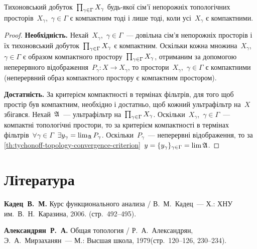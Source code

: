 \begin{theorem}
    Тихоновський добуток~$\prod_{\gamma\in\Gamma}{X}_\gamma$ будь-якої сім'ї непорожніх топологічних просторів~$X_\gamma$,~$\gamma \in \Gamma$ є компактним тоді і лише тоді, коли усі~$X_\gamma$ є компактними.
\end{theorem}

\begin{proof}
    \textbf{Необхідність.} Нехай~$X_\gamma$,~$\gamma \in \Gamma$~--- довільна сім'я непорожніх просторів і їх тихоновський добуток~$\prod_{\gamma\in\Gamma}{X}_\gamma$ є компактним. Оскільки кожна множина~$X_\gamma$,~$\gamma \in \Gamma$ є образом компактного простору~$\prod_{\gamma\in\Gamma}{X}_\gamma$, отриманим за допомогою неперервного відображення~$P_\gamma: X \to X_\gamma$, то простори~$X_\gamma$,~$\gamma \in \Gamma$ є компактними (неперервний образ компактного простору є компактним простором).

    \textbf{Достатність.} За критерієм компактності в термінах фільтрів, для того щоб простір був компактним, необхідно і достатньо, щоб кожний ультрафільтр на~$X$ збігався. Нехай~$\frak A$~--- ультрафільтр на~$\prod_{\gamma\in\Gamma}{X}_\gamma$. Оскільки~$X_\gamma$,~$\gamma \in \Gamma$~--- компактні топологічні простори, то за критерієм компактності в термінах фільтрів~$\forall \gamma \in \Gamma$~$\exists y_\gamma = \lim_{\frak A} P_\gamma$. Оскільки~$P_\gamma$~--- неперервні відображення, то за \cref{th:tychonoff-topology-convergence-criterion}~$y = \{y_\gamma\}_{\gamma \in \Gamma} = \lim \frak A$.
\end{proof}

\section{Література}

\begin{enumerate}[label={[\arabic*]}]
\item \textbf{Кадец~В.~М.}
Курс функционального анализа /
В.~М.~Кадец~---
Х.: ХНУ им.~В.~Н.~Каразина, 2006. (стр.~492--495).
\item \textbf{Александрян~Р.~А.}
Общая топология /
Р.~А.~Александрян, Э.~А.~Мирзаханян~---
М.: Высшая школа, 1979(стр.~120--126, 230--234).
\end{enumerate}
